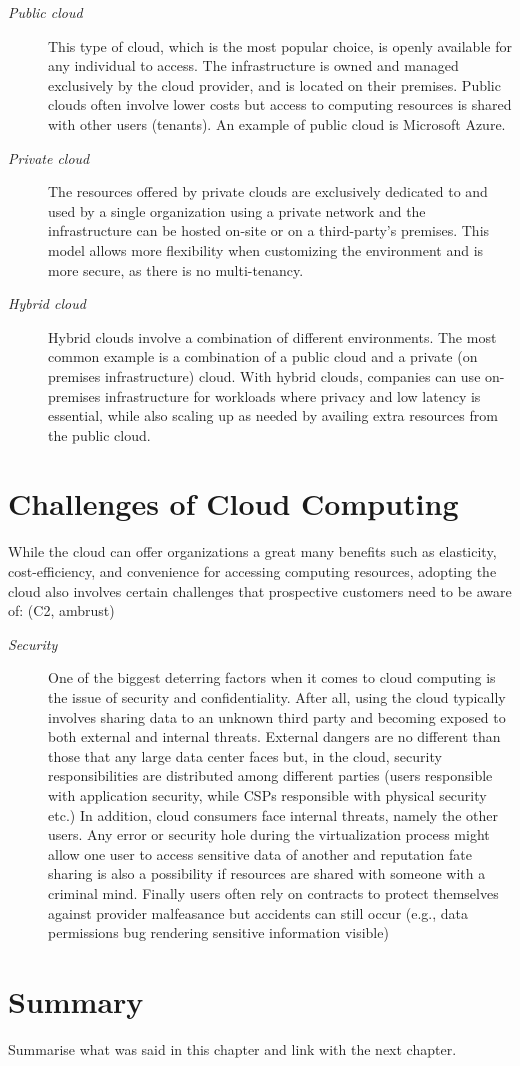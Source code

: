 \begin{description}
    \item [\textit{Public cloud}] This type of cloud, which is the most popular choice, is openly available for any individual to access. The infrastructure is owned and managed exclusively by the cloud provider, and is located on their premises. Public clouds often involve lower costs but access to computing resources is shared with other users (tenants). An example of public cloud is Microsoft Azure.

    \item [\textit{Private cloud}] The resources offered by private clouds are exclusively dedicated to and used by a single organization using a private network and the infrastructure can be hosted on-site or on a third-party's premises. This model allows more flexibility when customizing the environment and is more secure, as there is no multi-tenancy.

    \item [\textit{Hybrid cloud}] Hybrid clouds involve a combination of different environments. The most common example is a combination of a public cloud and a private (on premises infrastructure) cloud. With hybrid clouds, companies can use on-premises infrastructure for workloads where privacy and low latency is essential, while also scaling up as needed by availing extra resources from the public cloud.
\end{description}


\section{Challenges of Cloud Computing}
While the cloud can offer organizations a great many benefits such as elasticity, cost-efficiency, and convenience for accessing computing resources, adopting the cloud also involves certain challenges that prospective customers need to be aware of: (C2, ambrust)

\begin{description}
    \item [\textit{Security}] One of the biggest deterring factors when it comes to cloud computing is the issue of security and confidentiality. After all, using the cloud typically involves sharing data to an unknown third party and becoming exposed to both external and internal threats. External dangers are no different than those that any large data center faces but, in the cloud, security responsibilities are distributed among different parties (users responsible with application security, while CSPs responsible with physical security etc.) In addition, cloud consumers face internal threats, namely the other users. Any error or security hole during the virtualization process might allow one user to access sensitive data of another and reputation fate sharing is also a possibility if resources are shared with someone with a criminal mind. Finally users often rely on contracts to protect themselves against provider malfeasance but accidents can still occur (e.g., data permissions bug rendering sensitive information visible)

\end{description}



\section{Summary}
Summarise what was said in this chapter and link with the next chapter.
